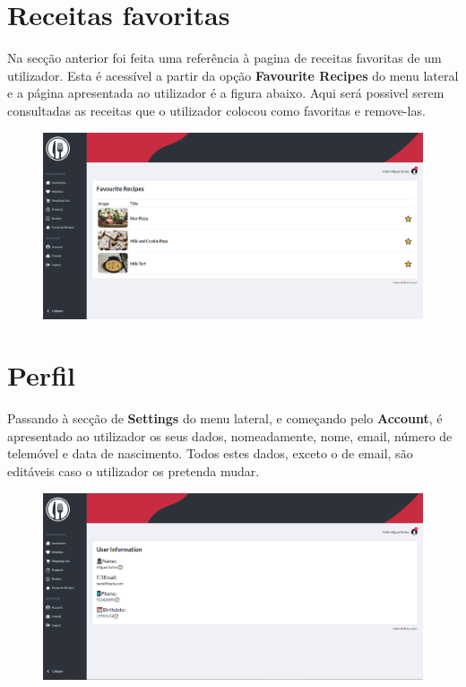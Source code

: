 \documentclass[a4paper]{report}
\begin{document}
    \section{Receitas favoritas}

    Na secção anterior foi feita uma referência à pagina de receitas favoritas
    de um utilizador. Esta é acessível a partir da opção 
    \textbf{Favourite Recipes} do menu lateral e a página apresentada ao 
    utilizador é a figura abaixo. Aqui será possivel serem consultadas as
    receitas que o utilizador colocou como favoritas e remove-las.

    \begin{figure}[H]
        \centering
            \includegraphics[width=\textwidth]{images/produto_final/receitas_favoritas.png}
    \end{figure}

    \section{Perfil}

    Passando à secção de \textbf{Settings} do menu lateral, e começando pelo 
    \textbf{Account}, é apresentado ao utilizador os seus dados, nomeadamente,
    nome, email, número de telemóvel e data de nascimento. Todos estes dados, 
    exceto o de email, são editáveis caso o utilizador os pretenda mudar.

    \begin{figure}[H]
        \centering
            \includegraphics[width=\textwidth]{images/produto_final/pagina_de_perfil.png}
    \end{figure}
\end{document}
